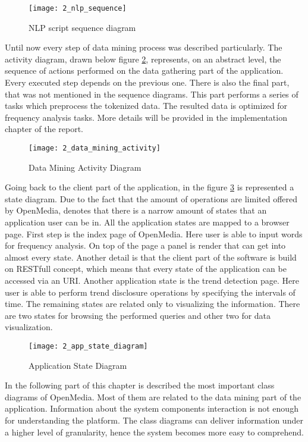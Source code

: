 \begin{figure}[!ht]
\centering
\texttt{[image: 2\_nlp\_sequence]}
\caption{NLP script sequence diagram}\label{nlp_sequence}
\end{figure}

Until now every step of data mining process was described particularly. The activity diagram, drawn below figure \ref{data_mining_activity}, represents, on an abstract level, the sequence of actions performed on the data gathering part of the application. Every executed step depends on the previous one. There is also the final part, that was not mentioned in the sequence diagrams. This part performs a series of tasks which preprocess the tokenized data. The resulted data is optimized for frequency analysis tasks. More details will be provided in the implementation chapter of the report.

\begin{figure}[!ht]
\centering
\texttt{[image: 2\_data\_mining\_activity]}
\caption{Data Mining Activity Diagram}\label{data_mining_activity}
\end{figure}

Going back to the client part of the application, in the figure \ref{app_state_diagram} is represented a state diagram. Due to the fact that the amount of operations are limited offered by OpenMedia, denotes that there is a narrow amount of states that an application user can be in. All the application states are mapped to a browser page. First step is the index page of OpenMedia. Here user is able to input words for frequency analysis. On top of the page a panel is render that can get into almost every state. Another detail is that the client part of the software is build on RESTfull concept, which means that every state of the application can be accessed via an URI. Another application state is the trend detection page. Here user is able to perform trend disclosure operations by specifying the intervals of time. The remaining states are related only to visualizing the information. There are two states for browsing the performed queries and other two for data visualization.

\begin{figure}[!ht]
\centering
\texttt{[image: 2\_app\_state\_diagram]}
\caption{Application State Diagram}\label{app_state_diagram}
\end{figure}

In the following part of this chapter is described the most important class diagrams of OpenMedia. Most of them are related to the data mining part of the application. Information about the system components interaction is not enough for understanding the platform. The class diagrams can deliver information under a higher level of granularity, hence the system becomes more easy to comprehend.

